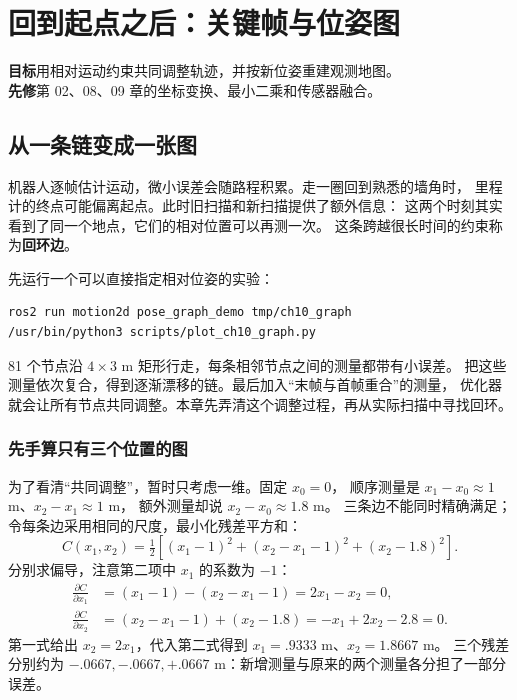 \chapter{回到起点之后：关键帧与位姿图}
\begin{notebox}
\textbf{目标}\quad 用相对运动约束共同调整轨迹，并按新位姿重建观测地图。\\
\textbf{先修}\quad 第 02、08、09 章的坐标变换、最小二乘和传感器融合。
\end{notebox}

\section{从一条链变成一张图}
机器人逐帧估计运动，微小误差会随路程积累。走一圈回到熟悉的墙角时，
里程计的终点可能偏离起点。此时旧扫描和新扫描提供了额外信息：
这两个时刻其实看到了同一个地点，它们的相对位置可以再测一次。
这条跨越很长时间的约束称为\textbf{回环边}。

先运行一个可以直接指定相对位姿的实验：
\begin{lstlisting}[language=bash]
ros2 run motion2d pose_graph_demo tmp/ch10_graph
/usr/bin/python3 scripts/plot_ch10_graph.py
\end{lstlisting}
81 个节点沿 $4\times3$ m 矩形行走，每条相邻节点之间的测量都带有小误差。
把这些测量依次复合，得到逐渐漂移的链。最后加入“末帧与首帧重合”的测量，
优化器就会让所有节点共同调整。本章先弄清这个调整过程，再从实际扫描中寻找回环。

\subsection{先手算只有三个位置的图}
为了看清“共同调整”，暂时只考虑一维。固定 $x_0=0$，
顺序测量是 $x_1-x_0\approx1$ m、$x_2-x_1\approx1$ m，
额外测量却说 $x_2-x_0\approx1.8$ m。
三条边不能同时精确满足；令每条边采用相同的尺度，最小化残差平方和：
\begin{equation}
C(x_1,x_2)=\tfrac12[(x_1-1)^2+(x_2-x_1-1)^2+(x_2-1.8)^2].
\end{equation}
分别求偏导，注意第二项中 $x_1$ 的系数为 $-1$：
\begin{align}
\frac{\partial C}{\partial x_1}&=(x_1-1)-(x_2-x_1-1)=2x_1-x_2=0,\\
\frac{\partial C}{\partial x_2}&=(x_2-x_1-1)+(x_2-1.8)=-x_1+2x_2-2.8=0.
\end{align}
第一式给出 $x_2=2x_1$，代入第二式得到 $x_1=.9333$ m、$x_2=1.8667$ m。
三个残差分别约为 $-.0667,-.0667,+.0667$ m：新增测量与原来的两个测量各分担了一部分误差。

